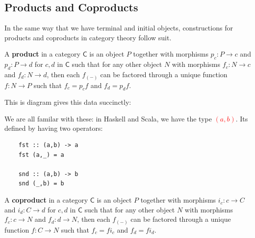 \documentclass[tikz]{beamer}
\newcommand{\cat}[1]{\bm{ \mathsf{#1} }}
\newcommand{\cc}{\cat{C}}
\newcommand{\mred}[1]{\textcolor{red}{$#1$}}
\theoremstyle{definition}
\begin{document}
\subsection{Products and Coproducts}

\frame
{

	In the same way that we have terminal and initial objects, constructions for products and coproducts in category theory follow suit.
}

\frame
{
	\begin{definition}[Product]
	
		A \textbf{product} in a category $\cc$ is an object $P$ together with morphisms $p_c : P \to c$ and $p_d : P \to d$ for $c,d$ in $\cc$ such that for any other object $N$ with morphisms $f_c : N \to c$ and $f_d : N \to d$, then each $f_{(-)}$ can be factored through a unique function $f : N \to P$ such that $f_c = p_cf$ and $f_d = p_df$. 
	\end{definition}
}

\begin{frame}[fragile]
	This is diagram gives this data succinctly: 
	
	\begin{center}
	\end{center}
\end{frame}

\begin{frame}[fragile]
	We are all familar with these: in Haskell and Scala, we have the type \mred{(a, b)}. Its defined by having two operators: 
	
	\begin{verbatim}
	fst :: (a,b) -> a
	fst (a,_) = a
	
	snd :: (a,b) -> b
	snd (_,b) = b
	\end{verbatim}
\end{frame}

\frame
{ 
	\begin{definition}[Coroduct]
	
		A \textbf{coproduct} in a category $\cc$ is an object $P$ together with morphisms $i_c : c \to C $ and $i_d : C \to d$ for $c,d$ in $\cc$ such that for any other object $N$ with morphisms $f_c : c \to N$ and $f_d : d \to N$, then each $f_{(-)}$ can be factored through a unique function $f : C \to N$ such that $f_c = fi_c$ and $f_d = fi_d$. 
	\end{definition}
	
}
\end{document}
